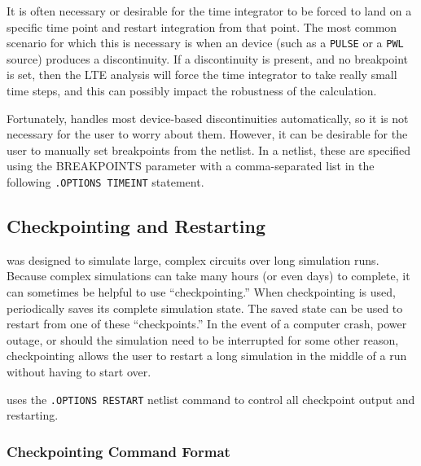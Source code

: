 
It is often necessary or desirable for the time integrator to be forced to land on a specific time point 
and restart integration from that point.   The most common scenario for which this is necessary is when
an device (such as a \texttt{PULSE} or a \texttt{PWL} source) produces a discontinuity.  If a discontinuity is
present, and no breakpoint is set, then the LTE analysis will force the time integrator to take really small
time steps, and this can possibly impact the robustness of the calculation.

Fortunately, \Xyce{} handles most device-based discontinuities automatically, so it is not necessary for the 
user to worry about them.  However, it can be desirable for the user to manually set breakpoints from the netlist.
In a \Xyce{} netlist, these are specified using the BREAKPOINTS parameter with a comma-separated list in
the following \texttt{.OPTIONS TIMEINT} statement.


\subsection{Checkpointing and Restarting}
\label{Restart}
 

\Xyce{} was designed to simulate large, complex circuits over long
simulation runs.  Because complex simulations can take many hours (or
even days) to complete, it can sometimes be helpful to use
``checkpointing.''  When checkpointing is used, \Xyce{} periodically
saves its complete simulation state.  The saved state can be used to
restart \Xyce{} from one of these ``checkpoints.''  In the event of a
computer crash, power outage, or should the simulation need to be
interrupted for some other reason, checkpointing allows the user to
restart a long simulation in the middle of a run without having to
start over.

\Xyce{} uses the   \verb|.OPTIONS RESTART|
netlist command to control all checkpoint output and restarting.  

\subsubsection{Checkpointing Command Format}
  

